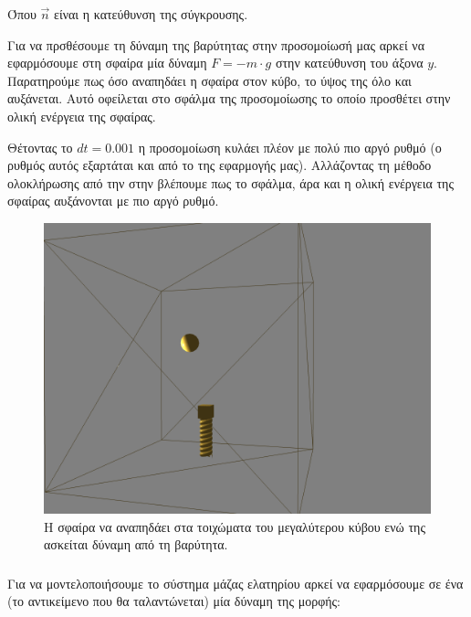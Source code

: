 \documentclass[11pt]{scrartcl} %
\begin{document}
Όπου $\vec{n}$ είναι η κατεύθυνση της σύγκρουσης.

Για να πρσθέσουμε τη δύναμη της βαρύτητας στην προσομοίωσή μας αρκεί να εφαρμόσουμε στη σφαίρα 
μία δύναμη $F = -m \cdot g$ στην κατεύθυνση του άξονα $y$.
Παρατηρούμε πως όσο αναπηδάει η σφαίρα στον κύβο, το ύψος της όλο και αυξάνεται. 
Αυτό οφείλεται στο σφάλμα της προσομοίωσης το οποίο προσθέτει στην ολική ενέργεια της σφαίρας.

Θέτοντας το $dt = 0.001$ η προσομοίωση κυλάει πλέον με πολύ πιο αργό ρυθμό (ο ρυθμός αυτός 
εξαρτάται και από το  της εφαρμογής μας). Αλλάζοντας τη μέθοδο ολοκλήρωσης 
από την  στην  βλέπουμε πως το σφάλμα, άρα και η ολική 
ενέργεια της σφαίρας αυξάνονται με πιο αργό ρυθμό.

\begin{figure}[H]
	\begin{center}
		\includegraphics[height=.5\textheight]{./assets/ball.png}
	\end{center}
	\caption{Η σφαίρα να αναπηδάει στα τοιχώματα του μεγαλύτερου κύβου ενώ της ασκείται δύναμη από τη βαρύτητα.}
\end{figure}

\subsubsection{}

Για να μοντελοποιήσουμε το σύστημα μάζας ελατηρίου αρκεί να εφαρμόσουμε σε ένα 
 (το αντικείμενο που θα ταλαντώνεται) μία δύναμη της μορφής:
\end{document}
